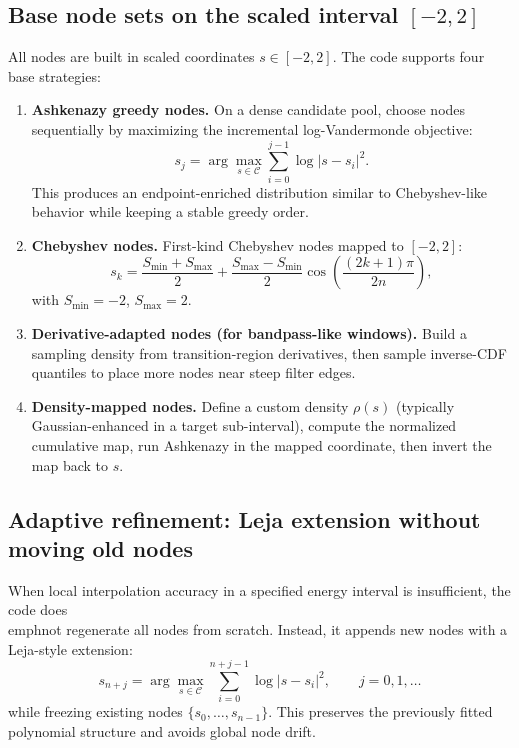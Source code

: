 \subsection{Base node sets on the scaled interval $[-2,2]$}

All nodes are built in scaled coordinates $s\in[-2,2]$.
The code supports four base strategies:
\begin{enumerate}
  \item \textbf{Ashkenazy greedy nodes.}
  On a dense candidate pool, choose nodes sequentially by maximizing the
  incremental log-Vandermonde objective:
  \begin{equation}
  s_j=\arg\max_{s\in\mathcal C}
  \sum_{i=0}^{j-1}\log|s-s_i|^2.
  \label{eq:ashkenazy_obj}
  \end{equation}
  This produces an endpoint-enriched distribution similar to Chebyshev-like
  behavior while keeping a stable greedy order.

  \item \textbf{Chebyshev nodes.}
  First-kind Chebyshev nodes mapped to $[-2,2]$:
  \begin{equation}
  s_k = \frac{S_{\min}+S_{\max}}{2}
      + \frac{S_{\max}-S_{\min}}{2}
      \cos\!\left(\frac{(2k+1)\pi}{2n}\right),
  \end{equation}
  with $S_{\min}=-2$, $S_{\max}=2$.

  \item \textbf{Derivative-adapted nodes (for bandpass-like windows).}
  Build a sampling density from transition-region derivatives, then sample
  inverse-CDF quantiles to place more nodes near steep filter edges.

  \item \textbf{Density-mapped nodes.}
  Define a custom density $\rho(s)$ (typically Gaussian-enhanced in a target
  sub-interval), compute the normalized cumulative map, run Ashkenazy in the
  mapped coordinate, then invert the map back to $s$.
\end{enumerate}

\subsection{Adaptive refinement: Leja extension without moving old nodes}

When local interpolation accuracy in a specified energy interval is
insufficient, the code does \\emph{not} regenerate all nodes from scratch.
Instead, it appends new nodes with a Leja-style extension:
\begin{equation}
s_{n+j}
=\arg\max_{s\in\mathcal C}
\sum_{i=0}^{n+j-1}\log|s-s_i|^2,
\qquad j=0,1,\dots
\label{eq:leja_append}
\end{equation}
while freezing existing nodes $\{s_0,\dots,s_{n-1}\}$.
This preserves the previously fitted polynomial structure and avoids global
node drift.

